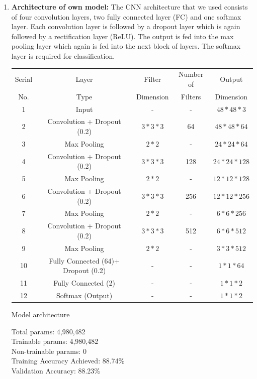 \documentclass[12pt]{article}
\begin{document}
\begin{enumerate}
\item \textbf {Architecture of own model:}
The CNN architecture that we used consists of four convolution layers, two fully connected layer (FC) and one softmax layer. Each convolution layer is followed by a dropout layer which is again followed by a rectification layer (ReLU). The output is fed into the max pooling layer which again is fed into the next block of layers. The softmax layer is required for classification.
\newpage
	\begin{table}[h!]
	\begin{tabular}{|c|c|c|c|c|}
	\hline
	Serial & Layer & Filter & Number of & Output \\ 
	No. & Type & Dimension & Filters & Dimension \\ \hline
	1 & Input & - & - & $48*48*3$ \\ \hline
	2 & Convolution + Dropout (0.2)& $3*3*3$ & 64 & $48*48*64$ \\
	3 & Max Pooling& $2*2$ & - & $24*24*64$ \\ \hline 
	4 & Convolution + Dropout (0.2)& $3*3*3$ & 128 & $24*24*128$ \\
	5 & Max Pooling& $2*2$ & - & $12*12*128$ \\ \hline 
	6 & Convolution + Dropout (0.2)& $3*3*3$ & 256 & $12*12*256$ \\
	7 & Max Pooling& $2*2$ & - & $6*6*256$ \\ \hline 
	8 & Convolution +  Dropout (0.2)& $3*3*3$ & 512 & $6*6*512$ \\
	9 & Max Pooling& $2*2$ & - & $3*3*512$ \\ \hline 
	10 & Fully Connected (64)+ Dropout (0.2) & - & - & $1*1*64$ \\ \hline
	11 & Fully Connected (2) & - & - & $1*1*2$ \\
	12 & Softmax (Output) & - & - & $1*1*2$ \\ \hline
	\end{tabular}
	\begin{center}
Model architecture\\
\end{center}
	\end{table}
	
Total params: 4,980,482\\
Trainable params: 4,980,482\\
Non-trainable params: 0\\[1cm]
Training Accuracy Achieved: 88.74\%\\
Validation Accuracy: 88.23\%\\


\end{enumerate}
\end{document}
